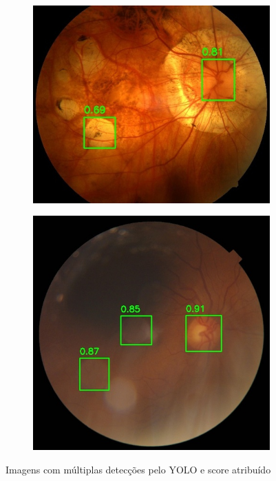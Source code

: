 \documentclass[12pt]{article}
\begin{document}
\begin{figure}
\begin{subfigure}[b]{0.47\textwidth}
        \label{fig:multiple_boxes_2}
    \end{subfigure}
    \break
    \begin{subfigure}[b]{0.47\textwidth}
        \centering
        \includegraphics[width=\textwidth]{images/multiple_boxes/TRAIN011494_boxes.jpg}
        \label{fig:multiple_boxes_3}
    \end{subfigure}
    \hfill
    \begin{subfigure}[b]{0.47\textwidth}
        \centering
        \includegraphics[width=\textwidth]{images/multiple_boxes/TRAIN031299_boxes.jpg}
        \label{fig:multiple_boxes_4}
    \end{subfigure}
    \caption{Imagens com múltiplas detecções pelo YOLO e score atribuído}
    \label{fig:multiple_boxes}
\end{figure}
\end{document}
